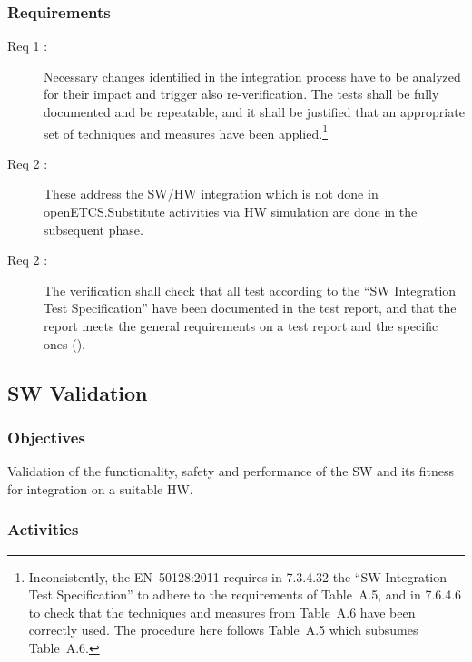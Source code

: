 \documentclass{template/openetcs_article}
\begin{document}
\subsubsection{Requirements}
\label{sec:6-requirements}

\begin{description}
\item[Req 1 {\cite[7.6.4.1, 7.4.6.6]{EN50128:2011}}:] Necessary
  changes identified in the integration process have to be analyzed
  for their impact and trigger also re-verification. The tests shall
  be fully documented and be repeatable, and it shall be justified that an appropriate set of
  techniques and measures have been applied.\footnote{Inconsistently, the EN~50128:2011
    requires in 7.3.4.32 the ``SW Integration Test Specification'' to
    adhere to the requirements of Table~A.5, and in 7.6.4.6 to check
    that the techniques and measures from Table~A.6 have been
    correctly used. The procedure here follows Table~A.5 which subsumes Table~A.6.} 
\item[Req 2 {\cite[7.6.4.7 to 7.4.6.10]{EN50128:2011}}:] These address
  the SW/HW integration which is not done in openETCS.Substitute
  activities via HW simulation are done in the subsequent phase.
\item[Req 2 {\cite[7.6.4.11 to 7.4.6.13]{EN50128:2011}}:] The
  verification shall check that all test according to the ``SW
  Integration Test Specification'' have been documented in the test
  report, and that the report meets the general requirements on a test
  report and the specific ones (\cite[7.6.4.1,
  7.4.6.6]{EN50128:2011}).
\end{description}


\subsection{SW Validation}
\label{sec:sw-validation}


\subsubsection{Objectives}
\label{sec:7-objectives}

Validation of the functionality, safety and performance of the SW and
its fitness for integration on a suitable HW.

\subsubsection{Activities}
\label{sec:7-activities}
\end{document}
